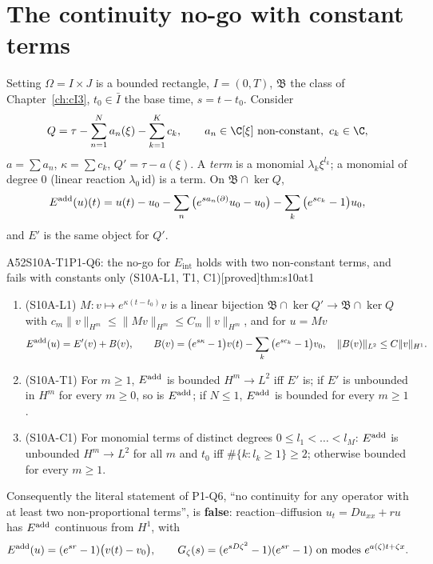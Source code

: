 \documentclass[11pt,a4paper,oneside]{report}
\newcommand{\badge}[2]{\textcolor{#1}{\textsf{\footnotesize[#2]}}}
\newcommand{\proved}{\badge{cC}{proved}}
\newcommand{\Eint}{E_{\mathrm{int}}}
\newenvironment{dimcard}[5]{\par\Needspace{12\baselineskip}\begin{dimcardbox}{#1}{#2}{#3}{#4}{#5}}{\end{dimcardbox}}
\begin{document}
\section{The continuity no-go with constant terms}

\begin{notebox}{Setting}
$\Omega=I\times J$ is a bounded rectangle, $I=(0,T)$, $\mathfrak B$ the class of Chapter~\ref{ch:cI3}, $t_0\in\bar I$ the base time, $s=t-t_0$. Consider
\[
Q=\tau-\sum_{n=1}^Na_n(\xi)-\sum_{k=1}^Kc_k,\qquad a_n\in\C[\xi]\ \text{non-constant},\ c_k\in\C,
\]
$a=\sum a_n$, $\kappa=\sum c_k$, $Q'=\tau-a(\xi)$. A \emph{term} is a monomial $\lambda_k\xi^{l_k}$; a monomial of degree $0$ (linear reaction $\lambda_0\,\mathrm{id}$) is a term. On $\mathfrak B\cap\ker Q$,
\[
E^{\rm add}(u)(t)=u(t)-u_0-\sum_n\big(e^{sa_n(\partial)}u_0-u_0\big)-\sum_k\big(e^{sc_k}-1\big)u_0,
\]
and $E'$ is the same object for $Q'$.
\end{notebox}

\begin{dimcard}{A52}{S10A-T1}{P1-Q6: the no-go for $\Eint$ holds with two non-constant terms, and fails with constants only (S10A-L1, T1, C1)}{\proved}{thm:s10at1}
\begin{enumerate}[label=(\alph*)]
\item (S10A-L1) $M:v\mapsto e^{\kappa(t-t_0)}v$ is a linear bijection $\mathfrak B\cap\ker Q'\to\mathfrak B\cap\ker Q$ with $c_m\|v\|_{H^m}\le\|Mv\|_{H^m}\le C_m\|v\|_{H^m}$, and for $u=Mv$
\[
E^{\rm add}(u)=E'(v)+B(v),\qquad B(v)=\big(e^{s\kappa}-1\big)v(t)-\sum_k\big(e^{sc_k}-1\big)v_0,\quad \|B(v)\|_{L^2}\le C\|v\|_{H^1}.
\]
\item (S10A-T1) For $m\ge1$, $E^{\rm add}$ is bounded $H^m\to L^2$ iff $E'$ is; if $E'$ is unbounded in $H^m$ for every $m\ge0$, so is $E^{\rm add}$; if $N\le1$, $E^{\rm add}$ is bounded for every $m\ge1$.
\item (S10A-C1) For monomial terms of distinct degrees $0\le l_1<\dots<l_M$: $E^{\rm add}$ is unbounded $H^m\to L^2$ for all $m$ and $t_0$ iff $\#\{k:l_k\ge1\}\ge2$; otherwise bounded for every $m\ge1$.
\end{enumerate}
Consequently the literal statement of P1-Q6, ``no continuity for any operator with at least two non-proportional terms'', is \textbf{false}: reaction--diffusion $u_t=Du_{xx}+ru$ has $E^{\rm add}$ continuous from $H^1$, with
\[
E^{\rm add}(u)=(e^{sr}-1)\big(v(t)-v_0\big),\qquad G_\zeta(s)=(e^{sD\zeta^2}-1)(e^{sr}-1)\ \text{on modes }e^{a(\zeta)t+\zeta x}.
\]
\end{dimcard}
\end{document}
